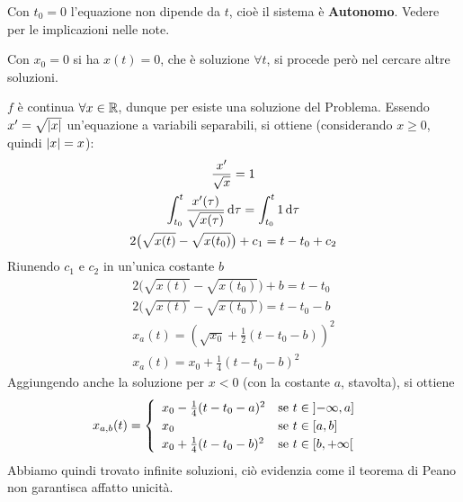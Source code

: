 \begin{example}
\begin{solution}
		\begin{note}
			Con $t_0 = 0$ l'equazione non dipende da $t$, cioè il sistema è \textbf{Autonomo}. Vedere  per le implicazioni nelle note.
		\end{note}
		\begin{note}
			Con $x_0 = 0$ si ha $x(t)=0$, che è soluzione $\forall t$, si procede però nel cercare altre soluzioni.
		\end{note}
		$f$ è continua $\forall x \in \mathbb{R}$, dunque per  esiste una soluzione del Problema. Essendo $x' = \sqrt{\left|x\right|}$ un'equazione a variabili separabili, si ottiene (considerando $x \geq 0$, quindi $\left|x\right| = x$):
		\begin{equation*}
			\begin{gathered}
				\frac{x'}{\sqrt{x}} = 1\\
				\int_{t_0}^{t}{\frac{x'(\tau)}{\sqrt{x(\tau)}}\,\mathrm{d}{\tau}} = \int_{t_0}^{t} 1 \,\mathrm{d}{\tau}\\
				2\bigl(\sqrt{x(t)} - \sqrt{x(t_0)}\bigr) + c_1 = t - t_0 + c_2\\
			\end{gathered}
		\end{equation*}
		Riunendo $c_1$ e $c_2$ in un'unica costante $b$
		\begin{equation*}
			\begin{gathered}
				2\bigl(\sqrt{x(t)} - \sqrt{x(t_0)}\bigr) + b = t - t_0\\
				2\bigl(\sqrt{x(t)} - \sqrt{x(t_0)}\bigr) = t - t_0 - b\\
				x_a(t) = \left( \sqrt{x_0} + \frac{1}{2}(t-t_0-b) \right)^2\\
				x_a(t) = x_0 + \frac{1}{4}(t-t_0-b)^2
			\end{gathered}
		\end{equation*}
		Aggiungendo anche la soluzione per $x < 0$ (con la costante $a$, stavolta), si ottiene
		\begin{equation*}
			x_{a,b}(t) =
			\begin{cases}
				\begin{array}{ll}
					x_0 - \frac{1}{4}(t-t_0-a)^2 & \text{se } t \in \left]-\infty,a\right]\\
					x_0 & \text{se } t \in \left[a,b\right]\\
					x_0 + \frac{1}{4}(t-t_0-b)^2 & \text{se } t \in \left[b,+\infty\right[
				\end{array}
			\end{cases}
		\end{equation*}
		Abbiamo quindi trovato infinite soluzioni, ciò evidenzia come il teorema di Peano non garantisca affatto unicità.


\end{solution}
\end{example}
